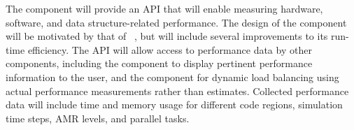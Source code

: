 \documentclass[11pt,letterpaper]{article}
\begin{document}
% 

%
The  component will provide an API that will enable
measuring hardware, software, and data structure-related performance.
The design of the  component will be motivated by
that of ~\cite{wwwlcaperf}, but will include several
improvements to its run-time efficiency.
The API will allow access to performance data by other components,
including the  component to display pertinent
performance information to the user, and the 
component for dynamic load balancing using actual 
performance measurements rather than estimates.  Collected performance 
data will include
time and memory usage for different code regions, simulation time steps,
AMR levels, and parallel tasks.
\end{document}

